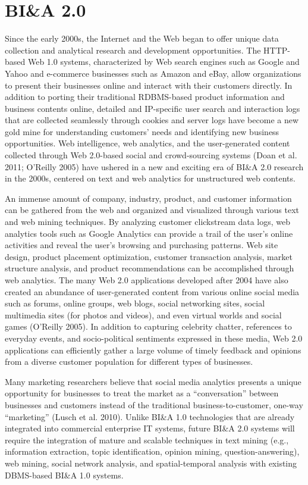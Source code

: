 \section*{BI\&A 2.0}
Since the early 2000s, the Internet and the Web began to offer
unique data collection and analytical research and development opportunities. The HTTP-based Web 1.0 systems,
characterized by Web search engines such as Google and
Yahoo and e-commerce businesses such as Amazon and
eBay, allow organizations to present their businesses online
and interact with their customers directly. In addition to
porting their traditional RDBMS-based product information
and business contents online, detailed and IP-specific user
search and interaction logs that are collected seamlessly
through cookies and server logs have become a new gold
mine for understanding customers’ needs and identifying new
business opportunities. Web intelligence, web analytics, and
the user-generated content collected through Web 2.0-based
social and crowd-sourcing systems (Doan et al. 2011;
O’Reilly 2005) have ushered in a new and exciting era of
BI\&A 2.0 research in the 2000s, centered on text and web
analytics for unstructured web contents.

An immense amount of company, industry, product, and
customer information can be gathered from the web and
organized and visualized through various text and web mining
techniques. By analyzing customer clickstream data logs,
web analytics tools such as Google Analytics can provide a
trail of the user’s online activities and reveal the user’s
browsing and purchasing patterns. Web site design, product
placement optimization, customer transaction analysis, market
structure analysis, and product recommendations can be
accomplished through web analytics. The many Web 2.0
applications developed after 2004 have also created an abundance of user-generated content from various online social
media such as forums, online groups, web blogs, social networking sites, social multimedia sites (for photos and videos),
and even virtual worlds and social games (O’Reilly 2005). In
addition to capturing celebrity chatter, references to everyday
events, and socio-political sentiments expressed in these
media, Web 2.0 applications can efficiently gather a large
volume of timely feedback and opinions from a diverse
customer population for different types of businesses.

Many marketing researchers believe that social media
analytics presents a unique opportunity for businesses to treat
the market as a “conversation” between businesses and
customers instead of the traditional business-to-customer,
one-way “marketing” (Lusch et al. 2010). Unlike BI\&A 1.0
technologies that are already integrated into commercial
enterprise IT systems, future BI\&A 2.0 systems will require
the integration of mature and scalable techniques in text
mining (e.g., information extraction, topic identification,
opinion mining, question-answering), web mining, social
network analysis, and spatial-temporal analysis with existing
DBMS-based BI\&A 1.0 systems.

